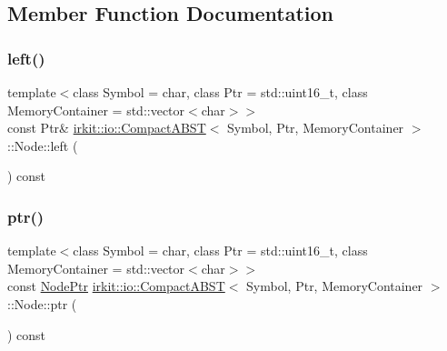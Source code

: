 \subsection{Member Function Documentation}
\mbox{\label{structirkit_1_1io_1_1CompactABST_1_1Node_aa771d81dcf049a3c4521591912d08c1c}} 
\subsubsection{\texorpdfstring{left()}{left()}}
{\footnotesize\ttfamily template$<$class Symbol = char, class Ptr = std\+::uint16\+\_\+t, class Memory\+Container = std\+::vector$<$char$>$$>$ \\
const Ptr\& \mbox{\hyperlink{classirkit_1_1io_1_1CompactABST}{irkit\+::io\+::\+Compact\+A\+B\+ST}}$<$ Symbol, Ptr, Memory\+Container $>$\+::Node\+::left (\begin{DoxyParamCaption}{ }\end{DoxyParamCaption}) const\hspace{0.3cm}{\ttfamily [inline]}}

\mbox{\label{structirkit_1_1io_1_1CompactABST_1_1Node_aa9472e8e5a01055041fbe129ce14f24a}} 
\subsubsection{\texorpdfstring{ptr()}{ptr()}}
{\footnotesize\ttfamily template$<$class Symbol = char, class Ptr = std\+::uint16\+\_\+t, class Memory\+Container = std\+::vector$<$char$>$$>$ \\
const \mbox{\hyperlink{structirkit_1_1io_1_1CompactABST_1_1NodePtr}{Node\+Ptr}} \mbox{\hyperlink{classirkit_1_1io_1_1CompactABST}{irkit\+::io\+::\+Compact\+A\+B\+ST}}$<$ Symbol, Ptr, Memory\+Container $>$\+::Node\+::ptr (\begin{DoxyParamCaption}{ }\end{DoxyParamCaption}) const\hspace{0.3cm}{\ttfamily [inline]}}

